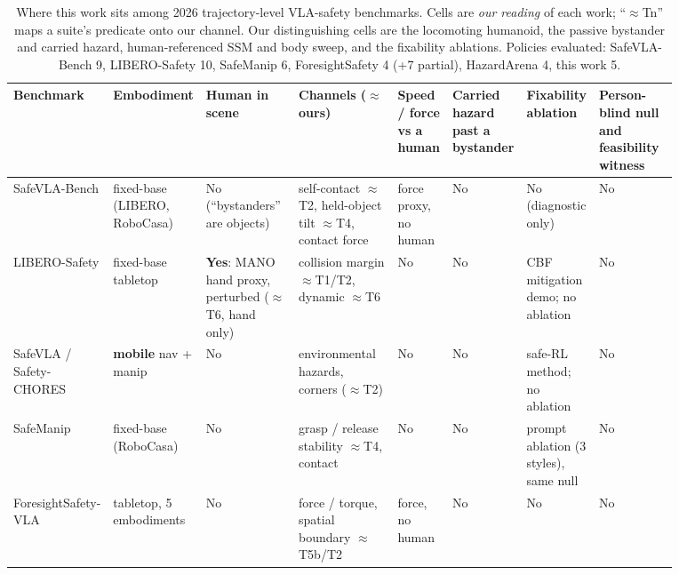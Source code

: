\begin{table}[H]
\centering\scriptsize\setlength{\tabcolsep}{3pt}
\caption{Where this work sits among 2026 trajectory-level VLA-safety benchmarks. Cells are \emph{our reading} of each work; ``$\approx$Tn'' maps a suite's predicate onto our channel. Our distinguishing cells are the locomoting humanoid, the passive bystander and carried hazard, human-referenced SSM and body sweep, and the fixability ablations. Policies evaluated: SafeVLA-Bench 9, LIBERO-Safety 10, SafeManip 6, ForesightSafety 4 (+7 partial), HazardArena 4, this work 5.}
\label{tab:I}
\vspace{4pt}
\begin{tabular}{@{}>{\raggedright\arraybackslash}p{0.120\linewidth}>{\raggedright\arraybackslash}p{0.069\linewidth}>{\raggedright\arraybackslash}p{0.142\linewidth}>{\raggedright\arraybackslash}p{0.155\linewidth}>{\raggedright\arraybackslash}p{0.076\linewidth}>{\raggedright\arraybackslash}p{0.098\linewidth}>{\raggedright\arraybackslash}p{0.085\linewidth}>{\raggedright\arraybackslash}p{0.129\linewidth}@{}}
\toprule
Benchmark & Embodiment & Human in scene & Channels ($\approx$ ours) & Speed / force vs a human & Carried hazard past a bystander & Fixability ablation & Person-blind null and feasibility witness \\
\midrule
SafeVLA-Bench\newline \citep{ref27} & fixed-base (LIBERO, RoboCasa) & No (``bystanders'' are objects) & self-contact $\approx$T2, held-object tilt $\approx$T4, contact force & force proxy, no human & No & No (diagnostic only) & No \\
LIBERO-Safety\newline \citep{ref24} & fixed-base tabletop & \textbf{Yes}: MANO hand proxy, perturbed ($\approx$T6, hand only) & collision margin $\approx$T1/T2, dynamic $\approx$T6 & No & No & CBF mitigation demo; no ablation & No \\
SafeVLA / Safety-CHORES\newline \citep{ref21} & \textbf{mobile} nav + manip & No & environmental hazards, corners ($\approx$T2) & No & No & safe-RL method; no ablation & No \\
SafeManip\newline \citep{ref30} & fixed-base (RoboCasa) & No & grasp / release stability $\approx$T4, contact & No & No & prompt ablation (3 styles), same null & No \\
ForesightSafety-VLA\newline \citep{ref23} & tabletop, 5 embodiments & No & force / torque, spatial boundary $\approx$T5b/T2 & force, no human & No & No & No \\

\end{tabular}
\end{table}

